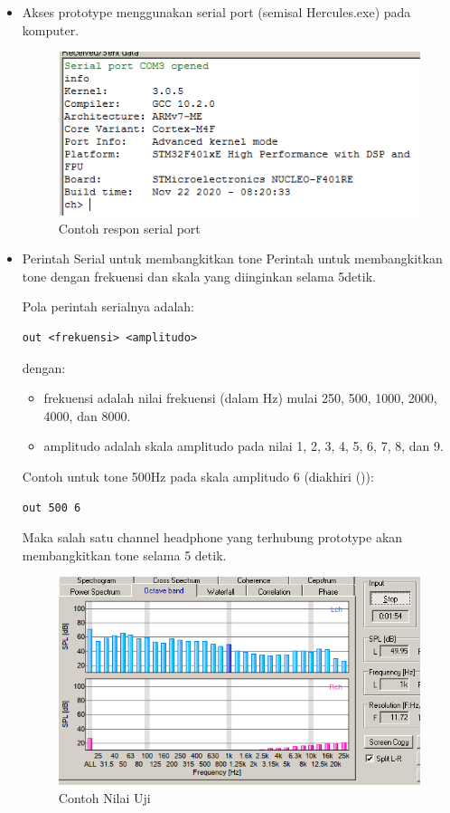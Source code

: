 \documentclass[12pt,]{article}
\begin{document}
\begin{itemize}
	
		\item Akses prototype menggunakan serial port (semisal Hercules.exe) pada komputer.
		\begin{figure}[!ht]
			\centering
			\includegraphics[width=300pt]{images/terminal/hercules_text}
			\caption{Contoh respon serial port}
		\end{figure}
		
		\item Perintah Serial untuk membangkitkan tone
		Perintah untuk membangkitkan tone dengan frekuensi dan skala yang diinginkan selama 5detik.

		Pola perintah serialnya adalah:
		\begin{verbatim}
out <frekuensi> <amplitudo>
		\end{verbatim}

		dengan:
		\begin{itemize}

			\item frekuensi adalah nilai frekuensi (dalam Hz) mulai 250, 500, 1000, 2000, 4000, dan 8000.

			\item amplitudo adalah skala amplitudo pada nilai 1, 2, 3, 4, 5, 6, 7, 8, dan 9.

		\end{itemize}

		Contoh untuk tone 500Hz pada skala amplitudo 6 (diakhiri (\keys{\return})):
		\begin{verbatim}
out 500 6
		\end{verbatim}
	
		\newpage
		Maka salah satu channel headphone yang terhubung prototype akan membangkitkan tone selama 5 detik.		
		
		\begin{figure}[!ht]
			\centering
			\includegraphics[width=300pt]{images/terminal/contoh}
			\caption{Contoh Nilai Uji}
		\end{figure}


\end{itemize}
\end{document}

